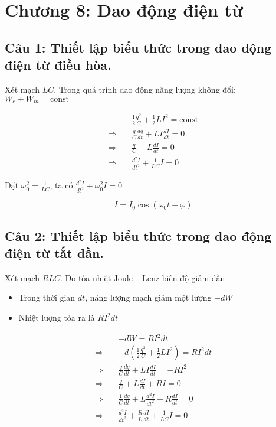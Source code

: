 \section[Chương 8]{Chương 8: Dao động điện từ}

\subsection[Câu 1]{Câu 1: Thiết lập biểu thức trong dao động điện từ điều hòa.}

Xét mạch $LC$. Trong quá trình dao động năng lượng không đổi: $W_e + W_m = \text{const}$

\begin{align*}
  {}\quad & \frac{1}{2} \frac{q^2}{C} + \frac{1}{2} LI^2 = \text{const} \\
  \Rightarrow\quad & \frac{q}{C} \frac{dq}{dt} + LI \frac{dI}{dt} = 0 \\
  \Rightarrow\quad & \frac{q}{C} + L\frac{dI}{dt} = 0 \\
  \Rightarrow\quad & \frac{d^2I}{dt^2} + \frac{1}{LC} I = 0
\end{align*}

Đặt $\omega_0^2 = \frac{1}{LC}$, ta có $\frac{d^2I}{dt^2} + \omega_0^2 I = 0$

\begin{equation*}
  I = I_0 \cos\left( \omega_0 t + \varphi \right)
\end{equation*}

\subsection[Câu 2]{Câu 2: Thiết lập biểu thức trong dao động điện từ tắt dần.}

Xét mạch $RLC$. Do tỏa nhiệt Joule -- Lenz biên độ giảm dần. 

\begin{itemize}
  \item Trong thời gian $dt$, năng lượng mạch giảm một lượng $-dW$
  \item Nhiệt lượng tỏa ra là $RI^2dt$
\end{itemize}

\begin{align*}
  {}\quad & -dW = RI^2dt \\
  \Rightarrow\quad & -d\left( \frac{1}{2} \frac{q^2}{C} + \frac{1}{2} LI^2 \right) = RI^2dt \\
  \Rightarrow\quad & \frac{q}{C} \frac{dq}{dt} + LI \frac{dI}{dt} = -RI^2 \\
  \Rightarrow\quad & \frac{q}{C} + L\frac{dI}{dt} + RI = 0 \\ 
  \Rightarrow\quad & \frac{1}{C} \frac{dq}{dt} + L\frac{d^2I}{dt^2} + R\frac{dI}{dt} = 0 \\
  \Rightarrow\quad & \frac{d^2I}{dt^2} + \frac{R}{L} \frac{dI}{dt} + \frac{1}{LC} I = 0
\end{align*}

